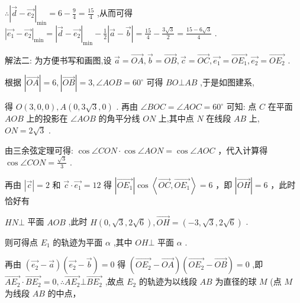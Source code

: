 \documentclass[10pt]{article}
\begin{document}
\(\therefore {\left| \overrightarrow{d} - \overrightarrow{{e}_{2}}\right| }_{\min } = 6 - \frac{9}{4} = \frac{15}{4}\) ,从而可得 \({\left| \overrightarrow{{e}_{1}} - \overrightarrow{{e}_{2}}\right| }_{\min } = {\left| \overrightarrow{d} - \overrightarrow{{e}_{2}}\right| }_{\min } - \frac{1}{2}\left| {\overrightarrow{a} - \overrightarrow{b}}\right|  = \frac{15}{4} - \frac{3\sqrt{3}}{2} = \frac{{15} - 6\sqrt{3}}{4}\) .

解法二: 为方便书写和画图,设 \(\overrightarrow{a} = \overrightarrow{OA},\overrightarrow{b} = \overrightarrow{OB},\overrightarrow{c} = \overrightarrow{OC},\overrightarrow{{e}_{1}} = \overrightarrow{O{E}_{1}},\overrightarrow{{e}_{2}} = \overrightarrow{O{E}_{2}}\) .

根据 \(\left| \overrightarrow{OA}\right|  = 6,\left| \overrightarrow{OB}\right|  = 3,\angle {AOB} = {60}^{ \circ  }\) 可得 \({BO} \bot  {AB}\) ,于是如图建系,

得 \(O\left( {3,0,0}\right) ,A\left( {0,3\sqrt{3},0}\right)\) . 再由 \(\angle {BOC} = \angle {AOC} = {60}^{ \circ  }\) 可知: 点 \(C\) 在平面 \({AOB}\) 上的投影在 \(\angle {AOB}\) 的角平分线 \({ON}\) 上,其中点 \(N\) 在线段 \({AB}\) 上, \({ON} = 2\sqrt{3}\) .

由三余弦定理可得: \(\cos \angle {CON} \cdot  \cos \angle {AON} = \cos \angle {AOC}\) ，代入计算得 \(\cos \angle {CON} = \frac{\sqrt{3}}{3}\) .

再由 \(\left| \overrightarrow{c}\right|  = 2\) 和 \(\overrightarrow{c} \cdot  \overrightarrow{{e}_{1}} = {12}\) 得 \(\left| \overrightarrow{O{E}_{1}}\right| \cos \left\langle  {\overrightarrow{OC},\overrightarrow{O{E}_{1}}}\right\rangle   = 6\) ，即 \(\left| \overrightarrow{OH}\right|  = 6\) ，此时恰好有

\({HN} \bot\) 平面 \({AOB}\) ,此时 \(H\left( {0,\sqrt{3},2\sqrt{6}}\right) ,\overrightarrow{OH} = \left( {-3,\sqrt{3},2\sqrt{6}}\right)\) .

则可得点 \({E}_{1}\) 的轨迹为平面 \(\alpha\) ,其中 \({OH} \bot\) 平面 \(\alpha\) .

再由 \(\left( {\overrightarrow{{e}_{2}} - \overrightarrow{a}}\right) \left( {\overrightarrow{{e}_{2}} - \overrightarrow{b}}\right)  = 0\) 得 \(\left( {\overrightarrow{O{E}_{2}} - \overrightarrow{OA}}\right) \left( {\overrightarrow{O{E}_{2}} - \overrightarrow{OB}}\right)  = 0\) ,即 \(\overrightarrow{A{E}_{2}} \cdot  \overrightarrow{B{E}_{2}} = 0,\therefore \overrightarrow{A{E}_{2}} \bot  \overrightarrow{B{E}_{2}}\) ,故点 \({E}_{2}\) 的轨迹为以线段 \({AB}\) 为直径的球 \(M\) (点 \(M\) 为线段 \({AB}\) 的中点，
\end{document}
